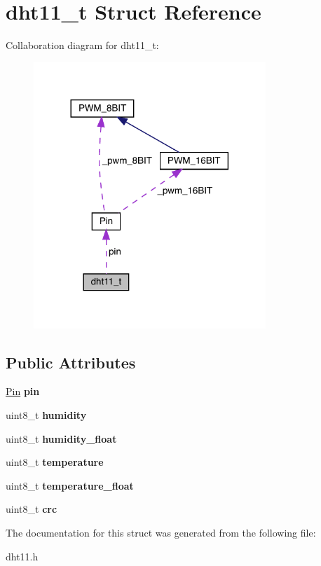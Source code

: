 \hypertarget{structdht11__t}{}\section{dht11\+\_\+t Struct Reference}
\label{structdht11__t}


Collaboration diagram for dht11\+\_\+t\+:\nopagebreak
\begin{figure}[H]
\begin{center}
\leavevmode
\includegraphics[width=248pt]{structdht11__t__coll__graph}
\end{center}
\end{figure}
\subsection*{Public Attributes}
\begin{DoxyCompactItemize}
\item 
\mbox{\label{structdht11__t_af7ba765d61375a8088a63e33b4e91a35}} 
\mbox{\hyperlink{classPin}{Pin}} {\bfseries pin}
\item 
\mbox{\label{structdht11__t_a981a3577bb83ac4f3f8f566e4eb9976c}} 
uint8\+\_\+t {\bfseries humidity}
\item 
\mbox{\label{structdht11__t_a3426ca69a0d25e6ff59cf1bb814194d5}} 
uint8\+\_\+t {\bfseries humidity\+\_\+float}
\item 
\mbox{\label{structdht11__t_acb375c16a957e10e3c316496492263da}} 
uint8\+\_\+t {\bfseries temperature}
\item 
\mbox{\label{structdht11__t_aebb3d3b42b5c014880980fc77af3f7b6}} 
uint8\+\_\+t {\bfseries temperature\+\_\+float}
\item 
\mbox{\label{structdht11__t_a51b07566b9cee55f9c9f473d4bda96d1}} 
uint8\+\_\+t {\bfseries crc}
\end{DoxyCompactItemize}


The documentation for this struct was generated from the following file\+:\begin{DoxyCompactItemize}
\item 
dht11.\+h\end{DoxyCompactItemize}
